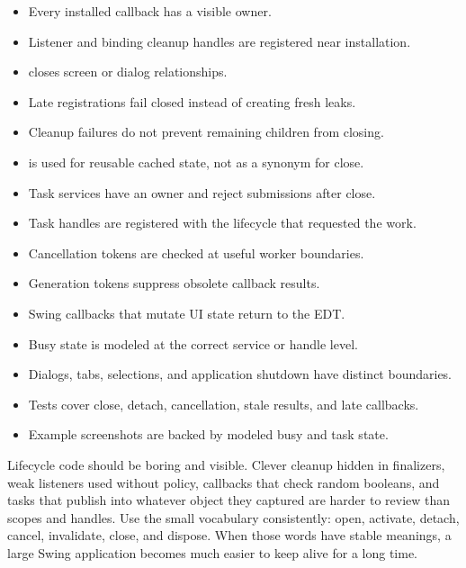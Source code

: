 \begin{itemize}
\item Every installed callback has a visible owner.
\item Listener and binding cleanup handles are registered near installation.
\item {} closes screen or dialog relationships.
\item Late registrations fail closed instead of creating fresh leaks.
\item Cleanup failures do not prevent remaining children from closing.
\item {} is used for reusable cached state, not as a synonym for close.
\item Task services have an owner and reject submissions after close.
\item Task handles are registered with the lifecycle that requested the work.
\item Cancellation tokens are checked at useful worker boundaries.
\item Generation tokens suppress obsolete callback results.
\item Swing callbacks that mutate UI state return to the EDT.
\item Busy state is modeled at the correct service or handle level.
\item Dialogs, tabs, selections, and application shutdown have distinct boundaries.
\item Tests cover close, detach, cancellation, stale results, and late callbacks.
\item Example screenshots are backed by modeled busy and task state.
\end{itemize}

Lifecycle code should be boring and visible. Clever cleanup hidden in
finalizers, weak listeners used without policy, callbacks that check random
booleans, and tasks that publish into whatever object they captured are harder
to review than scopes and handles. Use the small vocabulary consistently:
open, activate, detach, cancel, invalidate, close, and dispose. When those
words have stable meanings, a large Swing application becomes much easier to
keep alive for a long time.

